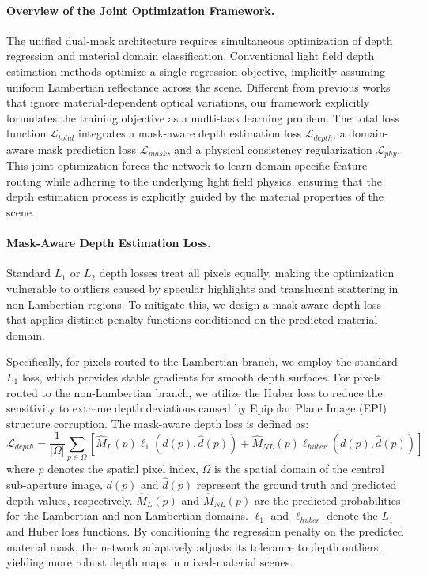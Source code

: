 \paragraph{Overview of the Joint Optimization Framework.}
The unified dual-mask architecture requires simultaneous optimization of depth regression and material domain classification. Conventional light field depth estimation methods optimize a single regression objective, implicitly assuming uniform Lambertian reflectance across the scene. Different from previous works that ignore material-dependent optical variations, our framework explicitly formulates the training objective as a multi-task learning problem. The total loss function $\mathcal{L}_{total}$ integrates a mask-aware depth estimation loss $\mathcal{L}_{depth}$, a domain-aware mask prediction loss $\mathcal{L}_{mask}$, and a physical consistency regularization $\mathcal{L}_{phy}$. This joint optimization forces the network to learn domain-specific feature routing while adhering to the underlying light field physics, ensuring that the depth estimation process is explicitly guided by the material properties of the scene.

\paragraph{Mask-Aware Depth Estimation Loss.}
Standard $L_1$ or $L_2$ depth losses treat all pixels equally, making the optimization vulnerable to outliers caused by specular highlights and translucent scattering in non-Lambertian regions. To mitigate this, we design a mask-aware depth loss that applies distinct penalty functions conditioned on the predicted material domain. 

Specifically, for pixels routed to the Lambertian branch, we employ the standard $L_1$ loss, which provides stable gradients for smooth depth surfaces. For pixels routed to the non-Lambertian branch, we utilize the Huber loss to reduce the sensitivity to extreme depth deviations caused by Epipolar Plane Image (EPI) structure corruption. The mask-aware depth loss is defined as:
\begin{equation}
\label{eq:eq25}
\mathcal{L}_{depth} = \frac{1}{|\Omega|} \sum_{p \in \Omega} \left[ \hat{M}_L(p) \ell_1(d(p), \hat{d}(p)) + \hat{M}_{NL}(p) \ell_{huber}(d(p), \hat{d}(p)) \right]
\end{equation}
where $p$ denotes the spatial pixel index, $\Omega$ is the spatial domain of the central sub-aperture image, $d(p)$ and $\hat{d}(p)$ represent the ground truth and predicted depth values, respectively. $\hat{M}_L(p)$ and $\hat{M}_{NL}(p)$ are the predicted probabilities for the Lambertian and non-Lambertian domains. $\ell_1$ and $\ell_{huber}$ denote the $L_1$ and Huber loss functions. By conditioning the regression penalty on the predicted material mask, the network adaptively adjusts its tolerance to depth outliers, yielding more robust depth maps in mixed-material scenes.

